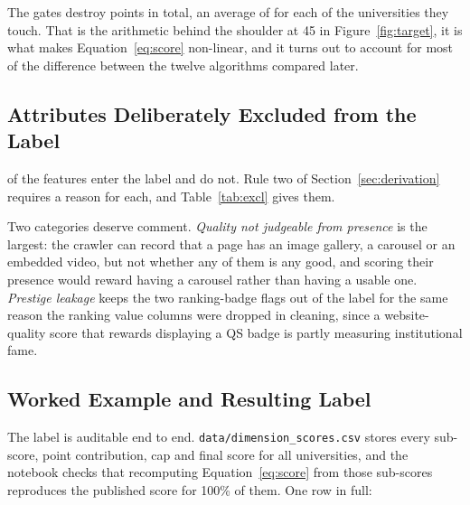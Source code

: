\documentclass[11pt,a4paper]{article}
\begin{document}
\noindent The gates destroy \ptsLost{} points in total, an average of \ptsLostMean{} for each of the
\nGated{} universities they touch. That is the arithmetic behind the shoulder at 45 in
Figure~\ref{fig:target}, it is what makes Equation~\eqref{eq:score} non-linear, and it turns out to
account for most of the difference between the twelve algorithms compared later.

\subsection{Attributes Deliberately Excluded from the Label}
\label{sec:exclusions}

\nScored{} of the \nFeat{} features enter the label and \nUnscored{} do not. Rule two of
Section~\ref{sec:derivation} requires a reason for each, and Table~\ref{tab:excl} gives them.

\begin{table}[H]\centering\small
\caption{The exclusion register. All \nFeat{} features, including these, are still supplied to every
model as input; only the target omits them.}
\label{tab:excl}

\end{table}

\noindent Two categories deserve comment. \emph{Quality not judgeable from presence} is the largest:
the crawler can record that a page has an image gallery, a carousel or an embedded video, but not
whether any of them is any good, and scoring their presence would reward having a carousel rather
than having a usable one. \emph{Prestige leakage} keeps the two ranking-badge flags out of the label
for the same reason the ranking value columns were dropped in cleaning, since a website-quality score
that rewards displaying a QS badge is partly measuring institutional fame.

\subsection{Worked Example and Resulting Label}

The label is auditable end to end. \texttt{data/dimension\_scores.csv} stores every sub-score, point
contribution, cap and final score for all \nUni{} universities, and the notebook checks that
recomputing Equation~\eqref{eq:score} from those sub-scores reproduces the published score for 100\%
of them. One row in full:

\begin{table}[H]\centering\small
\caption{Khulna University of Engineering \& Technology (\texttt{kuet.ac.bd}), scored step by step.
No gate applies, so the cap is 100 and the score is the plain weighted sum. Small discrepancies
against the published score are rounding, since the published value is computed from unrounded
sub-scores.}

\end{table}
\end{document}
